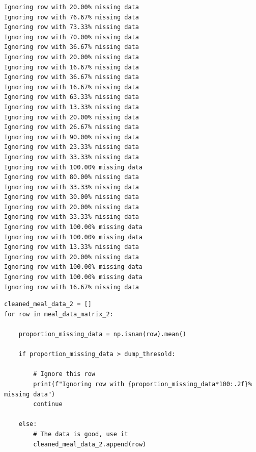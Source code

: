 \begin{verbatim}
Ignoring row with 20.00% missing data
Ignoring row with 76.67% missing data
Ignoring row with 73.33% missing data
Ignoring row with 70.00% missing data
Ignoring row with 36.67% missing data
Ignoring row with 20.00% missing data
Ignoring row with 16.67% missing data
Ignoring row with 36.67% missing data
Ignoring row with 16.67% missing data
Ignoring row with 63.33% missing data
Ignoring row with 13.33% missing data
Ignoring row with 20.00% missing data
Ignoring row with 26.67% missing data
Ignoring row with 90.00% missing data
Ignoring row with 23.33% missing data
Ignoring row with 33.33% missing data
Ignoring row with 100.00% missing data
Ignoring row with 80.00% missing data
Ignoring row with 33.33% missing data
Ignoring row with 30.00% missing data
Ignoring row with 20.00% missing data
Ignoring row with 33.33% missing data
Ignoring row with 100.00% missing data
Ignoring row with 100.00% missing data
Ignoring row with 13.33% missing data
Ignoring row with 20.00% missing data
Ignoring row with 100.00% missing data
Ignoring row with 100.00% missing data
Ignoring row with 16.67% missing data
\end{verbatim}

\begin{verbatim}
cleaned_meal_data_2 = []
for row in meal_data_matrix_2:

    proportion_missing_data = np.isnan(row).mean()

    if proportion_missing_data > dump_thresold:

        # Ignore this row
        print(f"Ignoring row with {proportion_missing_data*100:.2f}% missing data")
        continue

    else:
        # The data is good, use it
        cleaned_meal_data_2.append(row)
\end{verbatim}

